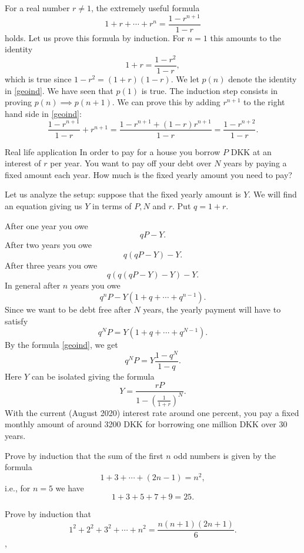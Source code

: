\documentclass{article}
\begin{document}
\begin{example}
  For a real number $r\neq 1$, the extremely useful formula
  \begin{equation}\label{geoind}
  1 + r + \cdots + r^n = \frac{1 - r^{n+1}}{1-r}
  \end{equation}
  holds. Let us prove this formula by induction. For $n=1$ this amounts to the identity
  $$
  1 + r = \frac{1-r^2}{1-r},
  $$
  which is true since $1-r^2 = (1+r)(1-r)$. We let $p(n)$ denote
  the identity in \eqref{geoind}. We have seen that $p(1)$ is true. The induction step
  consists in proving $p(n)\implies p(n+1)$. We can prove this
  by adding $r^{n+1}$ to the right hand side in \eqref{geoind}:
  $$
  \frac{1 - r^{n+1}}{1-r} + r^{n+1} = \frac{1 - r^{n+1} + (1-r) r^{n+1}}{1-r} = \frac{1 - r^{n+2}}{1-r}.
  $$
\begin{hideinbutton}{Real life application}
    In order to pay for a house you borrow $P$ DKK at an interest of
    $r$ per year. You want to pay off your debt over $N$ years by
    paying a fixed amount each year. How much is the fixed yearly
    amount you need to pay?

    Let us analyze the setup: suppose that the fixed yearly amount
    is $Y$. We will find an equation giving us $Y$ in terms of
    $P, N$ and $r$. Put $q = 1+ r$.

    After one year you owe
    $$
    q P - Y.
    $$
    After two years you owe
    $$
    q(q P - Y) - Y.
    $$
    After three years you owe
    $$
    q ( q ( q P - Y) - Y) - Y.
    $$
    In general after $n$ years you owe
    $$
    q^n P - Y (1 + q + \cdots + q^{n-1}).
    $$
    Since we want to be debt free after $N$ years, the yearly payment will have to satisfy
    $$
    q^N P = Y ( 1 + q + \cdots + q^{N-1}).
    $$
    By the formula \eqref{geoind}, we get
    $$
    q^N P = Y \frac{1-q^N}{1-q}.
    $$
    Here $Y$ can be isolated giving the formula
    $$
    Y = \frac{r P}{1 - \left(\frac{1}{1+r}\right)^N}.
    $$
    With the current (August 2020) interest rate around one percent, you pay a fixed monthly
    amount of around 3200 DKK for borrowing one million DKK over $30$ years.
  \end{hideinbutton}
\end{example}


\beginshex
Prove by induction that the sum of the first $n$ odd numbers is
given by the formula
$$
1 + 3 + \cdots + (2 n - 1) = n^2,
$$
i.e., for $n=5$ we have
$$
1 + 3 + 5 + 7 + 9 = 25.
$$
\endshex

\beginshex
Prove by induction that
$$
1^2 + 2^2 + 3^2 + \cdots + n^2 = \frac{n(n+1)(2n + 1)}{6}.
$$, 
\endshex
\end{document}
